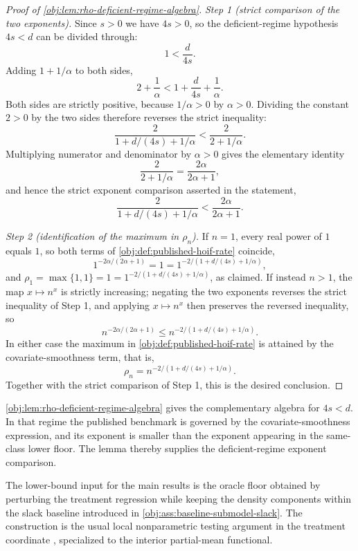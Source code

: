 \documentclass[11pt]{article}
\begin{document}
\begin{proof}[Proof of \cref{obj:lem:rho-deficient-regime-algebra}]
\emph{Step 1 (strict comparison of the two exponents).} Since \(s>0\) we have \(4s>0\), so the
deficient-regime hypothesis \(4s<d\) can be divided through:
\[
1<\frac d{4s}.
\]
Adding \(1+1/\alpha\) to both sides,
\[
2+\frac1\alpha
<
1+\frac d{4s}+\frac1\alpha .
\]
Both sides are strictly positive, because \(1/\alpha>0\) by \(\alpha>0\). Dividing the constant
\(2>0\) by the two sides therefore reverses the strict inequality:
\[
\frac{2}{1+d/(4s)+1/\alpha}
<
\frac{2}{2+1/\alpha}.
\]
Multiplying numerator and denominator by \(\alpha>0\) gives the elementary identity
\[
\frac{2}{2+1/\alpha}
=
\frac{2\alpha}{2\alpha+1},
\]
and hence the strict exponent comparison asserted in the statement,
\[
\frac{2}{1+d/(4s)+1/\alpha}
<
\frac{2\alpha}{2\alpha+1}.
\]

\emph{Step 2 (identification of the maximum in \(\rho_n\)).} If \(n=1\), every real power of \(1\)
equals \(1\), so both terms of \cref{obj:def:published-hoif-rate} coincide,
\[
1^{-2\alpha/(2\alpha+1)}=1=1^{-2/(1+d/(4s)+1/\alpha)},
\]
and \(\rho_1=\max\{1,1\}=1=1^{-2/(1+d/(4s)+1/\alpha)}\), as claimed. If instead \(n>1\), the map
\(x\mapsto n^{x}\) is strictly increasing; negating the two exponents reverses the strict inequality
of Step 1, and applying \(x\mapsto n^{x}\) then preserves the reversed inequality, so
\[
n^{-2\alpha/(2\alpha+1)}
\le
n^{-2/(1+d/(4s)+1/\alpha)} .
\]
In either case the maximum in \cref{obj:def:published-hoif-rate} is attained by the
covariate-smoothness term, that is,
\[
\rho_n
=
n^{-2/(1+d/(4s)+1/\alpha)} .
\]
Together with the strict comparison of Step 1, this is the desired conclusion.
\end{proof}

\cref{obj:lem:rho-deficient-regime-algebra} gives the complementary algebra for \(4s<d\). In that regime the published benchmark is governed by the covariate-smoothness expression, and its exponent is smaller than the exponent appearing in the same-class lower floor. The lemma thereby supplies the deficient-regime exponent comparison.

The lower-bound input for the main results is the oracle floor obtained by perturbing the treatment regression while keeping the density components within the slack baseline introduced in \cref{obj:ass:baseline-submodel-slack}. The construction is the usual local nonparametric testing argument in the treatment coordinate \citep{stone1982,tsybakov2009,goldenshluger2020}, specialized to the interior partial-mean functional.
\end{document}
